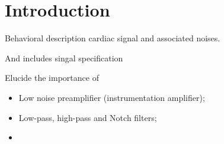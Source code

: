 \section{Introduction}

Behavioral description cardiac signal and associated noises.

And includes singal specification

Elucide the importance of

\begin{itemize}
    \item Low noise preamplifier (instrumentation amplifier);
    \item Low-pass, high-pass and Notch filters;
    \item 
\end{itemize}

\pagebreak